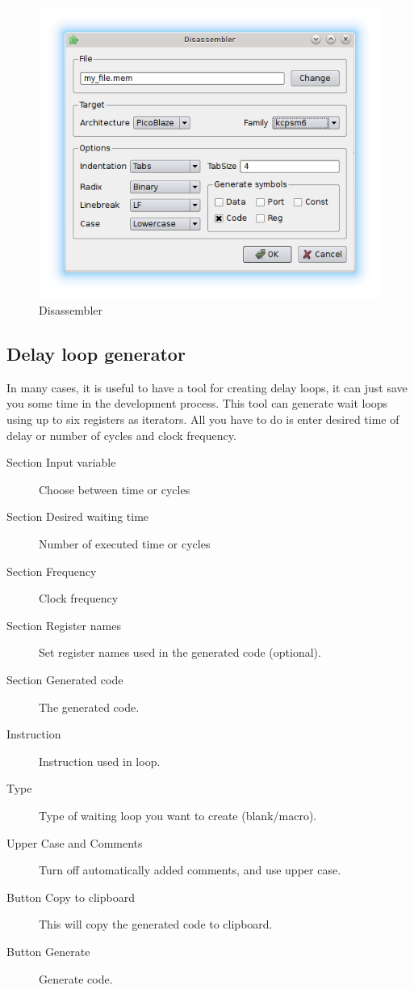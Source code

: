         \begin{figure}[h]
            \centering
            \includegraphics[width=.5\textwidth]{img/disassembler_window.png}
            \caption{Disassembler}
        \end{figure}

    \clearpage
    \subsection{Delay loop generator}
        In many cases, it is useful to have a tool for creating delay loops, it can just save you some time in the
        development process. This tool can generate wait loops using up to six registers as iterators. All you have to do is
        enter desired time of delay or number of cycles and clock frequency.

        \begin{description}
            \item[Section Input variable] Choose between time or cycles
            \item[Section Desired waiting time] Number of executed time or cycles
            \item[Section Frequency] Clock frequency
            \item[Section Register names] Set register names used in the generated code (optional).
            \item[Section Generated code] The generated code.
            \item[Instruction] Instruction used in loop.
            \item[Type] Type of waiting loop you want to create (blank/macro).
            \item[Upper Case and Comments]  Turn off automatically added comments, and use upper case.
            \item[Button Copy to clipboard] This will copy the generated code to clipboard.
            \item[Button Generate] Generate code.
        \end{description}

